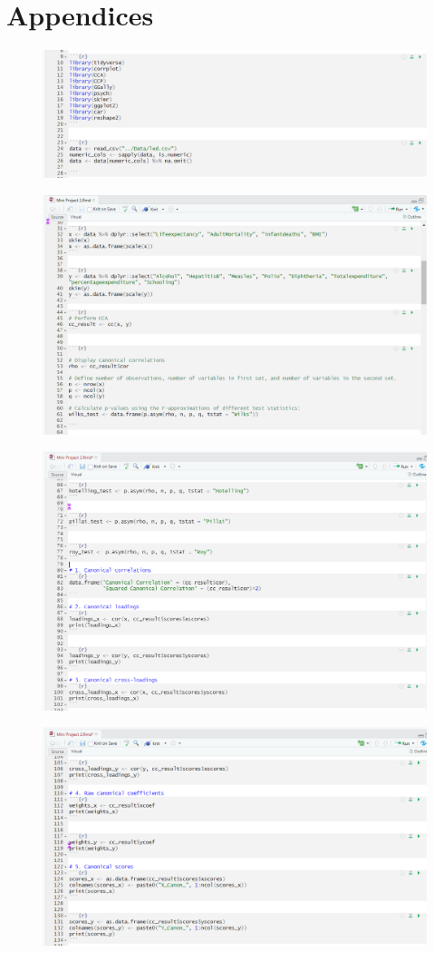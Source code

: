 \documentclass[11pt]{article}
\begin{document}
	
	\section{Appendices}
	
	\begin{figure}[h]
		\centering
		\includegraphics[width=0.7\linewidth]{../Image/1}
		\label{fig:1}
	\end{figure}
	
	\begin{figure}[h]
		\centering
		\includegraphics[width=0.7\linewidth]{../Image/2}
	\end{figure}
	
	\begin{figure}[h]
		\centering
		\includegraphics[width=0.7\linewidth]{../Image/3}
	\end{figure}
	
	\begin{figure}[h]
		\centering
		\includegraphics[width=0.7\linewidth]{../Image/4}
	\end{figure}
	
\end{document}
